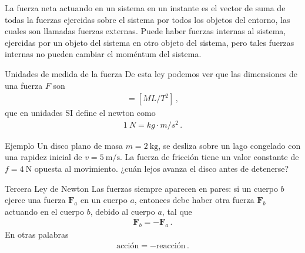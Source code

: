 \begin{frame}
    La fuerza neta actuando en un sistema en un instante es el vector de
suma de todas la fuerzas ejercidas sobre el sistema por todos los
objetos del entorno, las cuales son llamadas fuerzas externas. Puede
haber fuerzas internas al sistema, ejercidas por un objeto del sistema
en otro objeto del sistema, pero tales fuerzas internas no pueden
cambiar el moméntum del sistema.
\end{frame}

\begin{frame}{Unidades de medida de la fuerza}
    De esta ley podemos ver que las dimensiones de una fuerza $F$ son 
\begin{align*}
[F]=[M L/T^2]\,,
\end{align*}
que en unidades SI define el newton como 
\begin{align*}
\SI{1}{N}=\si{kg\cdot m/s^2}\,.
\end{align*}
\end{frame}

\begin{frame}{Ejemplo}
    Un disco plano de masa $m=\SI{2}{\kilo\gram}$, se desliza sobre un lago congelado con una rapidez inicial de $v=\SI{5}{\meter\per\second}$. La fuerza de fricci\'on tiene un valor constante de $f=\SI{4}{\newton}$ opuesta al movimiento. ¿cuán lejos avanza el disco antes de detenerse?
\end{frame}

\begin{frame}{Tercera Ley de Newton}
    Las fuerzas siempre aparecen en pares: si un cuerpo $b$ ejerce una fuerza $\mathbf{F}_a$ en un cuerpo $a$, entonces debe haber otra fuerza $\mathbf{F}_b$ actuando en el cuerpo $b$, debido al cuerpo $a$, tal que
\begin{align}
  \mathbf{F}_b=-\mathbf{F}_a\,.
\end{align}
En otras palabras
\begin{align}
  \text{acci\'on}=-\text{reacci\'on}\,.
\end{align}


\end{frame}

